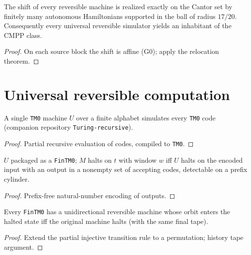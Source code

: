 \begin{theorem}
\label{thm_realize}
\leanok
{}
The shift of every reversible machine is realized exactly on the Cantor set by finitely many
autonomous Hamiltonians supported in the ball of radius $17/20$. Consequently every universal
reversible simulator yields an inhabitant of the CMPP class.
\end{theorem}
\begin{proof}\leanok
On each source block the shift is affine (G0); apply the relocation theorem.
\end{proof}

\chapter{Universal reversible computation}
\label{chap_universal}

\begin{theorem}
\label{thm_universal_tm}
\leanok
{}
A single \texttt{TM0} machine $U$ over a finite alphabet simulates every \texttt{TM0} code
(companion repository \texttt{Turing-recursive}).
\end{theorem}
\begin{proof}\leanok
Partial recursive evaluation of codes, compiled to \texttt{TM0}.
\end{proof}

\begin{theorem}
\label{thm_universal_fintm0}
\leanok
{}
$U$ packaged as a \texttt{FinTM0}; $M$ halts on $t$ with window $w$ iff $U$ halts on the encoded
input with an output in a nonempty set of accepting codes, detectable on a prefix cylinder.
\end{theorem}
\begin{proof}\leanok
Prefix-free natural-number encoding of outputs.
\end{proof}

\begin{theorem}
\label{thm_bennett}
\leanok
{}
Every \texttt{FinTM0} has a unidirectional reversible machine whose orbit enters the halted state
iff the original machine halts (with the same final tape).
\end{theorem}
\begin{proof}\leanok
Extend the partial injective transition rule to a permutation; history tape argument.
\end{proof}

